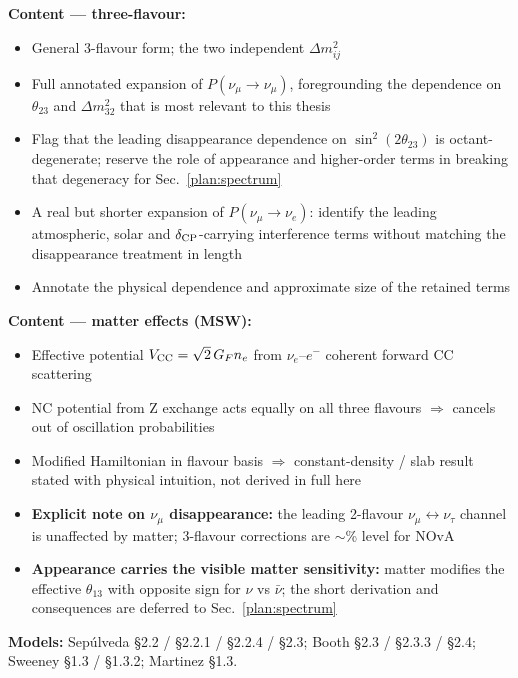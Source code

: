 \documentclass[11pt]{article}
\begin{document}
\textbf{Content --- three-flavour:}
\begin{itemize}
    \item General 3-flavour form; the two independent $\Delta m^{2}_{ij}$
    \item Full annotated expansion of $P(\nu_\mu \to \nu_\mu)$, foregrounding the dependence on
    $\theta_{23}$ and $\Delta m^{2}_{32}$ that is most relevant to this thesis
    \item Flag that the leading disappearance dependence on $\sin^{2}(2\theta_{23})$ is
    octant-degenerate; reserve the role of appearance and higher-order terms in breaking that
    degeneracy for Sec.~\ref{plan:spectrum}
    \item A real but shorter expansion of $P(\nu_\mu \to \nu_e)$: identify the leading atmospheric,
    solar and $\delta_{\rm CP}$-carrying interference terms without matching the disappearance
    treatment in length
    \item Annotate the physical dependence and approximate size of the retained terms
\end{itemize}

\textbf{Content --- matter effects (MSW):}
\begin{itemize}
    \item Effective potential $V_{\rm CC} = \sqrt{2}\,G_{F} n_{e}$ from $\nu_e$--$e^-$ coherent
    forward CC scattering
    \item NC potential from Z exchange acts equally on all three flavours $\Rightarrow$ cancels
    out of oscillation probabilities
    \item Modified Hamiltonian in flavour basis $\Rightarrow$ constant-density / slab result
    stated with physical intuition, not derived in full here
    \item \textbf{Explicit note on $\nu_\mu$ disappearance:} the leading 2-flavour
    $\nu_\mu \leftrightarrow \nu_\tau$ channel is unaffected by matter; 3-flavour corrections
    are $\sim$\% level for NOvA
    \item \textbf{Appearance carries the visible matter sensitivity:} matter modifies the
    effective $\theta_{13}$ with opposite sign for $\nu$ vs $\bar\nu$; the short derivation and
    consequences are deferred to Sec.~\ref{plan:spectrum}
\end{itemize}

\textbf{Models:} Sep\'ulveda \S2.2 / \S2.2.1 / \S2.2.4 / \S2.3; Booth \S2.3 / \S2.3.3 / \S2.4;
Sweeney \S1.3 / \S1.3.2; Martinez \S1.3.
\end{document}
